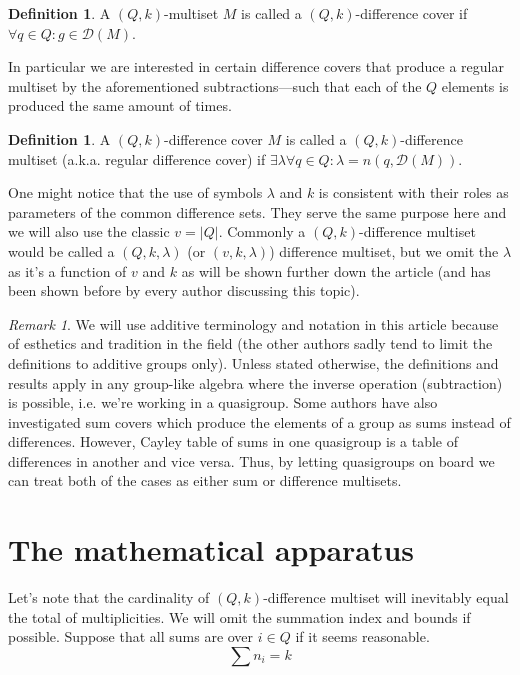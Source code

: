 \documentclass{article}
\theoremstyle{plain}
\theoremstyle{definition}
\newtheorem{definition}[theorem]{Definition}
\theoremstyle{remark}
\newtheorem{remark}[theorem]{Remark}
\begin{document}
		\begin{definition}
			\label{dms:def:dc}
			A $(Q,k)$-multiset $M$ is called a $(Q,k)$-difference cover if $\forall q \in Q \colon g \in \mathcal D(M)$.
		\end{definition}
		
		In particular we are interested in certain difference covers that produce a regular multiset by the aforementioned subtractions---such that each of the $Q$ elements is produced the same amount of times.
		
		\begin{definition}
			\label{dms:def:dms}
			A $(Q,k)$-difference cover $M$ is called a $(Q,k)$-difference multiset (a.k.a. regular difference cover) if $\exists \lambda  \forall q \in Q \colon \lambda = n(q, \mathcal D(M))$.
		\end{definition}
		
		One might notice that the use of symbols $\lambda$ and $k$ is consistent with their roles as parameters of the common difference sets. They serve the same purpose here and we will also use the classic $v = |Q|$. Commonly a $(Q,k)$-difference multiset would be called a $(Q,k,\lambda)$ (or $(v,k,\lambda)$) difference multiset, but we omit the $\lambda$ as it's a function of $v$ and $k$ as will be shown further down the article (and has been shown before by every author discussing this topic).
		
		\begin{remark}
			\label{dms:remark:abelian}
			We will use additive terminology and notation in this article because of esthetics and tradition in the field (the other authors sadly tend to limit the definitions to additive groups only). Unless stated otherwise, the definitions and results apply in any group-like algebra where the inverse operation (subtraction) is possible, i.e. we're working in a quasigroup.
			Some authors \cite{haanpaa2004minimum} have also investigated sum covers which produce the elements of a group as sums instead of differences. However, Cayley table of sums in one quasigroup is a table of differences in another and vice versa. Thus, by letting quasigroups on board we can treat both of the cases as either sum or difference multisets.
		\end{remark}
	
	\section{The mathematical apparatus}
		Let's note that the cardinality of $(Q,k)$-difference multiset will inevitably equal the total of multiplicities. We will omit the summation index and bounds if possible. Suppose that all sums are over $i \in Q$ if it seems reasonable.
		\begin{equation}
			\label{apparatus:eq:ni}
			\sum {n_i} = k
		\end{equation}
		
\end{document}
